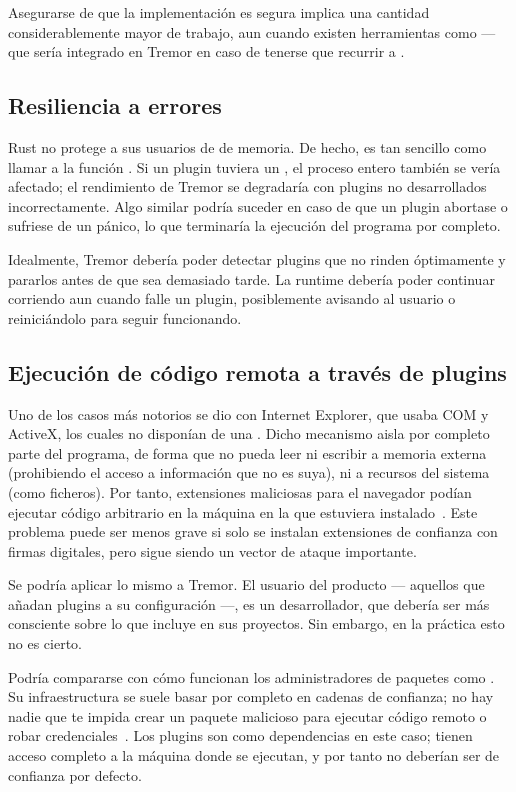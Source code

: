 Asegurarse de que la implementación es segura implica una cantidad
considerablemente mayor de trabajo, aun cuando existen herramientas como
 --- que sería integrado en Tremor en caso de tenerse que
recurrir a \unsafe.

\subsection{Resiliencia a errores}

Rust no protege a sus usuarios de \leaks de memoria. De hecho, es tan sencillo
como llamar a la función . Si un plugin tuviera un \leak, el
proceso entero también se vería afectado; el rendimiento de Tremor se degradaría
con plugins no desarrollados incorrectamente. Algo similar podría suceder en
caso de que un plugin abortase o sufriese de un pánico, lo que terminaría la
ejecución del programa por completo.

Idealmente, Tremor debería poder detectar plugins que no rinden óptimamente y
pararlos antes de que sea demasiado tarde. La runtime debería poder continuar
corriendo aun cuando falle un plugin, posiblemente avisando al usuario o
reiniciándolo para seguir funcionando.

\subsection{Ejecución de código remota a través de plugins}

Uno de los casos más notorios se dio con Internet Explorer, que usaba COM y
ActiveX, los cuales no disponían de una \sandbox. Dicho mecanismo aisla por
completo parte del programa, de forma que no pueda leer ni escribir a memoria
externa (prohibiendo el acceso a información que no es suya), ni a recursos del
sistema (como ficheros). Por tanto, extensiones maliciosas para el navegador
podían ejecutar código arbitrario en la máquina en la que estuviera
instalado~\cite{iesandbox}. Este problema puede ser menos grave si solo se
instalan extensiones de confianza con firmas digitales, pero sigue siendo un
vector de ataque importante.

Se podría aplicar lo mismo a Tremor. El usuario del producto --- aquellos que
añadan plugins a su configuración ---, es un desarrollador, que debería ser más
consciente sobre lo que incluye en sus proyectos. Sin embargo, en la práctica
esto no es cierto.

Podría compararse con cómo funcionan los administradores de paquetes como
. Su infraestructura se suele basar por completo en cadenas de
confianza; no hay nadie que te impida crear un paquete malicioso para ejecutar
código remoto o robar credenciales~\cite{npm1}\cite{npm2}. Los plugins son como
dependencias en este caso; tienen acceso completo a la máquina donde se
ejecutan, y por tanto no deberían ser de confianza por defecto.

